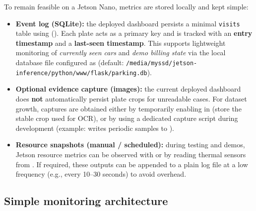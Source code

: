 \noindent
To remain feasible on a Jetson Nano, metrics are stored locally and kept simple:
\begin{itemize}
	\item \textbf{Event log (SQLite):}
	the deployed dashboard persists a minimal \texttt{visits} table using  ().
	Each plate acts as a primary key and is tracked with an \textbf{entry timestamp} and a \textbf{last-seen timestamp}.
	This supports lightweight monitoring of \emph{currently seen cars} and \emph{demo billing state} via the local database file configured as  (default:\linebreak
	\texttt{/media/myssd/jetson-inference/python/www/flask/parking.db}).
	\item \textbf{Optional evidence capture (images):}
	the current deployed dashboard does \textbf{not} automatically persist plate crops for unreadable cases.
	For dataset growth, captures are obtained either by temporarily enabling  in  (store the stable crop used for OCR), or by using a dedicated capture script during development (example:  writes periodic samples to ).
	\item \textbf{Resource snapshots (manual / scheduled):}
	during testing and demos, Jetson resource metrics can be observed with  or by reading thermal sensors from .
	If required, these outputs can be appended to a plain log file at a low frequency (e.g., every 10--30 seconds) to avoid overhead.
\end{itemize}

\subsection{Simple monitoring architecture}

